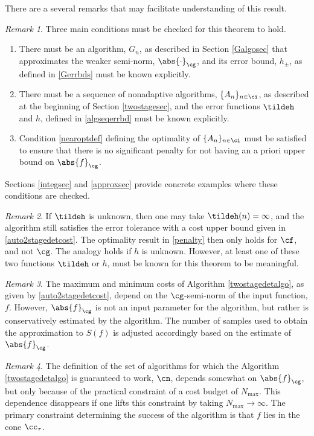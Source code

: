 \documentclass[]{elsarticle}
\theoremstyle{definition}
\theoremstyle{remark}
\newtheorem{rem}{Remark}
\newcommand{\Gnorm}[1]{\abs{#1}_{\cg}}
\begin{document}
There are a several remarks that may facilitate understanding of this result.

\begin{rem} Three main conditions must be checked for this theorem to hold.
\begin{enumerate}
\renewcommand{\labelenumi}{\roman{enumi}.}
\item There must be an algorithm, $G_n$, as described in Section \ref{Galgosec} that approximates the weaker semi-norm,  $\Gnorm{\cdot}$, and its error bound, $h_{\pm}$, as defined in \eqref{Gerrbds} must be known explicitly.
\item There must be a  sequence of nonadaptive algorithms, $\{A_n\}_{n \in \ci}$, as described at the beginning of  Section \ref{twostagesec}, and the error functions $\tildeh$ and $h$, defined in \eqref{algseqerrbd} must be known explicitly.  
\item Condition \eqref{nearoptdef} defining the optimality of $\{A_n\}_{n \in \ci}$ must be satisfied to ensure that there is no significant penalty for not having an a priori upper bound on $\Gnorm{f}$.
\end{enumerate}
Sections \ref{integsec} and \ref{approxsec} provide concrete examples where these conditions are checked.
\end{rem}

\begin{rem} If $\tildeh$ is unknown, then one may take $\tildeh(n)=\infty$, and the algorithm still satisfies the error tolerance with a cost upper bound given in \eqref{auto2stagedetcost}.  The optimality result in \eqref{penalty} then only holds for $\cf$, and not $\cg$.  The analogy holds if $h$ is unknown.  However, at least one of these two functions $\tildeh$ or $h$, must be known for this theorem to be meaningful.
\end{rem}

\begin{rem} The maximum and minimum costs of Algorithm \ref{twostagedetalgo}, as given by \eqref{auto2stagedetcost}, depend on the $\cg$-semi-norm of the input function, $f$.  However, $\Gnorm{f}$ is not an input parameter for the algorithm, but rather is  conservatively estimated by the algorithm.  The number of samples used to obtain the approximation to $S(f)$ is adjusted accordingly based on the estimate of $\Gnorm{f}$.
\end{rem}

\begin{rem}
The definition of the set of algorithms for which the Algorithm \ref{twostagedetalgo} is guaranteed to work, $\cn$, depends somewhat on $\Gnorm{f}$, but only because of the practical constraint of a cost budget of $N_{\max}$.  This dependence disappears if one lifts this constraint by taking $N_{\max} \to \infty$.  The primary constraint determining the success of the algorithm is that $f$ lies in the cone $\cc_{\tau}$.
\end{rem}
\end{document}
